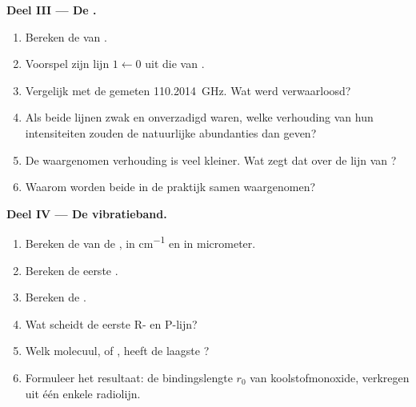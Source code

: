 \begin{problem}
\medskip\noindent\textbf{Deel III --- De .}
\begin{enumerate}[resume]
  \item Bereken de  van .
  \item Voorspel zijn lijn $1 \leftarrow 0$ uit die van .
  \item Vergelijk met de gemeten \qty{110.2014}{GHz}. Wat werd verwaarloosd?
  \item Als beide lijnen zwak en onverzadigd waren, welke verhouding van
        hun intensiteiten zouden de natuurlijke abundanties dan geven?
  \item De waargenomen verhouding is veel kleiner. Wat zegt dat over de lijn van
        ?
  \item Waarom worden beide  in de praktijk samen waargenomen?
\end{enumerate}

\medskip\noindent\textbf{Deel IV --- De vibratieband.}
\begin{enumerate}[resume]
  \item Bereken de  van de , in
        \unit{cm^{-1}} en in micrometer.
  \item Bereken de eerste .
  \item Bereken de .
  \item Wat scheidt de eerste R- en P-lijn?
  \item Welk molecuul,  of , heeft de laagste ?
  \item Formuleer het resultaat: de bindingslengte $r_0$ van
        koolstofmonoxide, verkregen uit één enkele radiolijn.
\end{enumerate}
\end{problem}
